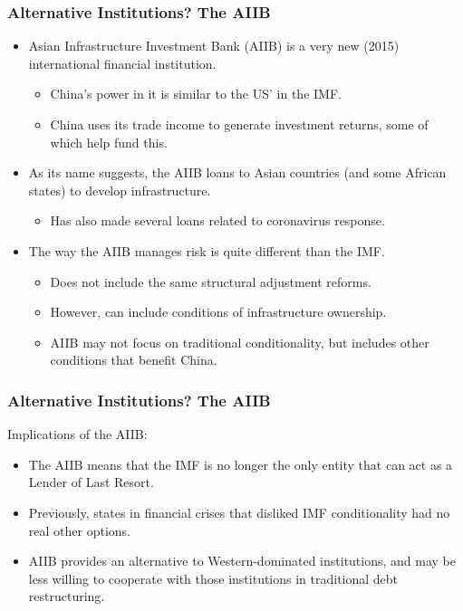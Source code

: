 \documentclass[handout]{beamer}
\begin{document}
\begin{frame} 
	\frametitle{\LARGE{Alternative Institutions? The AIIB}}
	\begin{itemize}
			\item Asian Infrastructure Investment Bank (AIIB) is a very new (2015) international financial institution. \pause 
			\begin{itemize}
			    \item China's power in it is similar to the US' in the IMF. \pause 
			    \item China uses its trade income to generate investment returns, some of which help fund this. \pause
			 \end{itemize}
			\item As its name suggests, the AIIB loans to Asian countries (and some African states) to develop infrastructure. \pause 
			\begin{itemize}
			    \item Has also made several loans related to coronavirus response. \pause 
			    \end{itemize}
			\item The way the AIIB manages risk is quite different than the IMF. \pause 
			\begin{itemize}
			    \item Does not include the same structural adjustment reforms. \pause 
			    \item However, can include conditions of infrastructure ownership. \pause 
			    \item AIIB may not focus on traditional conditionality, but includes other conditions that benefit China.
		    \end{itemize}
	\end{itemize}
\end{frame}

\begin{frame} 
	\frametitle{\LARGE{Alternative Institutions? The AIIB}}
Implications of the AIIB:
	\begin{itemize}
		\item The AIIB means that the IMF is no longer the only entity that can act as a Lender of Last Resort. \pause
		\item Previously, states in financial crises that disliked IMF conditionality had no real other options. \pause
		\item AIIB provides an alternative to Western-dominated institutions, and may be less willing to cooperate with those institutions in traditional debt restructuring. \pause
	\end{itemize}
\end{frame}
\end{document}
